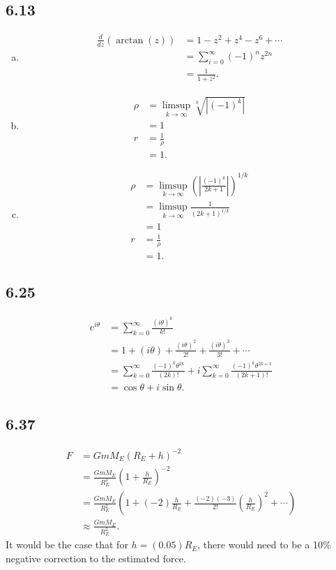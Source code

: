 \documentclass[10pt]{mypackage}
\begin{document}
\subsection{6.13}%
\begin{enumerate}[(a)]
  \item 
    \begin{align*}
      \frac{d}{dz}\left(\arctan(z)\right) &= 1 - z^2 + z^4 - z^6 + \cdots\\
                                          &= \sum_{i=0}^{\infty}(-1)^{n}z^{2n}\\
                                          &= \frac{1}{1+z^2}.
    \end{align*}
  \item 
    \begin{align*}
      \rho &= \limsup_{k\rightarrow\infty}\sqrt[k]{\left|\left(-1\right)^k\right|}\\
           &= 1\\
      r &= \frac{1}{\rho}\\
        &= 1.
    \end{align*}
  \item 
    \begin{align*}
      \rho &= \limsup_{k\rightarrow\infty}\left(\left|\frac{(-1)^k}{2k+1}\right|\right)^{1/k}\\
           &= \limsup_{k\rightarrow\infty}\frac{1}{\left(2k+1\right)^{1/k}}\\
           &= 1\\
      r &= \frac{1}{\rho}\\
        &= 1.
    \end{align*}
\end{enumerate}
\subsection{6.25}%
\begin{align*}
  e^{i\theta} &= \sum_{k=0}^{\infty}\frac{\left(i\theta\right)^{k}}{k!}\\
              &= 1 + \left(i\theta\right) + \frac{\left(i\theta\right)^2}{2!} + \frac{\left(i\theta\right)^3}{3!} + \cdots\\
              &= \sum_{k=0}^{\infty}\frac{(-1)^{k}\theta^{2k}}{\left(2k\right)!} + i\sum_{k=0}^{\infty}\frac{\left(-1\right)^{k}\theta^{2k+1}}{\left(2k+1\right)!}\\
              &= \cos\theta + i\sin\theta.
\end{align*}
\subsection{6.37}%
\begin{align*}
  F &= GmM_E\left(R_E + h\right)^{-2}\\
    &= \frac{GmM_E}{R_E^2}\left(1 + \frac{h}{R_E}\right)^{-2}\\
    &= \frac{GmM_E}{R_E^2}\left(1 + (-2)\frac{h}{R_E} + \frac{(-2)(-3)}{2!}\left(\frac{h}{R_E}\right)^2 + \cdots \right)\\
    &\approx \frac{GmM_E}{R_E^2}.
\end{align*}
It would be the case that for $h = \left(0.05\right)R_E$, there would need to be a 10\% negative correction to the estimated force.
\end{document}
